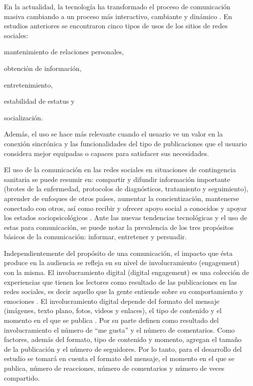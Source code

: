 \documentclass[spanish]{textolivre}
\begin{document}
 En la actualidad, la tecnología ha transformado el proceso de comunicación masiva cambiando a un proceso más interactivo, cambiante y dinámico \cite{huttHerrera2012}. En estudios anteriores \cite{ku2013} se encontraron cinco tipos de usos de los sitios de redes sociales: 
 \begin{enumerate*}[label=\arabic*)] 
 \item mantenimiento de relaciones personales, 
 \item obtención de información, 
 \item entretenimiento, 
 \item estabilidad de estatus y 
 \item socialización.
 \end{enumerate*}
 Además, el uso se hace más relevante cuando el usuario ve un valor en la conexión sincrónica y las funcionalidades del tipo de publicaciones que el usuario considera mejor equipadas o capaces para satisfacer sus necesidades. 
 
El uso de la comunicación en las redes sociales en situaciones de contingencia sanitaria se puede resumir en: compartir y difundir información importante (brotes de la enfermedad, protocolos de diagnósticos, tratamiento y seguimiento), aprender de enfoques de otros países, aumentar la concientización, mantenerse conectado con otros, así como recibir y ofrecer apoyo social a conocidos y apoyar los estados sociopsicológicos \cite{saud2020,gonzlezPadilla2020}. Ante las nuevas tendencias tecnológicas y el uso de estas para comunicación, se puede notar la prevalencia de los tres propósitos básicos de la comunicación: informar, entretener y persuadir. 

Independientemente del propósito de una comunicación, el impacto que ésta produce en la audiencia se refleja en su nivel de involucramiento (engagement) con la misma. El involucramiento digital (digital engagement) es una colección de experiencias que tienen los lectores como resultado de las publicaciones en las redes sociales, es decir aquello que la gente entiende sobre su comportamiento y emociones \cite{davisMersey2010,pletikosaCvijikj2013}. El involucramiento digital depende del formato del mensaje (imágenes, texto plano, fotos, videos y enlaces), el tipo de contenido y el momento en el que se publica \cite{pletikosaCvijikj2013}. Por su parte \textcite{sabate2014} definen como resultado del involucramiento el número de “me gusta” y el número de comentarios. Como factores, además del formato, tipo de contenido y momento, agregan el tamaño de la publicación y el número de seguidores. Por lo tanto, para el desarrollo del estudio se tomará en cuenta el formato del mensaje, el momento en el que se publica, número de reacciones, número de comentarios y número de veces compartido. 
\end{document}
